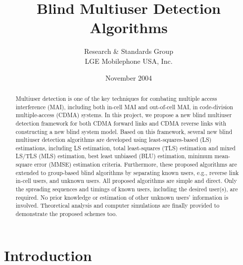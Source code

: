 \documentclass[a4paper,11pt,fleqn]{article}
\title{Blind Multiuser Detection Algorithms}
\author{Research \& Standards Group\\ LGE Mobilephone USA, Inc.}
\date{November 2004}
\begin{document}
\maketitle

\pagebreak

\tableofcontents

\pagebreak

\listoffigures

\pagebreak


\begin{abstract}
Multiuser detection is one of the key techniques for combating
multiple access interference (MAI), including both in-cell MAI and
out-of-cell MAI, in code-division multiple-access (CDMA) systems.
In this project, we propose a new blind multiuser detection
framework for both CDMA forward links and CDMA reverse links with
constructing a new blind system model. Based on this framework,
several new blind multiuser detection algorithms are developed
using least-squares-based (LS) estimations, including LS
estimation, total least-squares (TLS) estimation and mixed LS/TLS
(MLS) estimation, best least unbiased (BLU) estimation, minimum
mean-square error (MMSE) estimation criteria. Furthermore, these
proposed algorithms are extended to group-based blind algorithms
by separating known users, e.g., reverse link in-cell users, and
unknown users. All proposed algorithms are simple and direct. Only
the spreading sequences and timings of known users, including the
desired user(s), are required. No prior knowledge or estimation of
other unknown users' information is involved. Theoretical analysis
and computer simulations are finally provided to demonstrate the
proposed schemes too.
\end{abstract}

\pagebreak

\section{Introduction}
\end{document}
